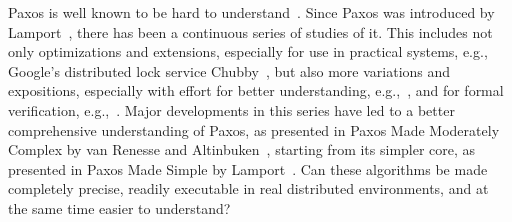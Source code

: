 \documentclass[11pt]{article}
\begin{document}
Paxos is well known to be hard to
understand~\cite{lam01paxos}. %
Since Paxos was introduced by Lamport~\cite{Lam98paxos,lam-paxos-history},
there has been a continuous series of studies of it.
This includes not only optimizations and extensions, especially for use in
practical systems, e.g., Google's distributed lock service
Chubby~\cite{burrows06chubby,chandra07paxos},
but also more variations and expositions, especially with effort for better
understanding,
e.g.,~\cite{lampson1996build,prisco00revisit,lam01paxos,ongaro14raft,vra15paxos,van15vive,garcia18paxos},
and for formal verification,
e.g.,~\cite{hawblitzel2015ironfleet,wilcox2015verdi,woos2016planning,Cha+16PaxosTLAPS-FM,padon2017paxos,ChaLiu18PaxosHistVarTLAPS-NFM,taube2018modular}.
Major developments in this series have led to a better comprehensive
understanding of Paxos, as presented in Paxos Made Moderately Complex by
van Renesse and Altinbuken~\cite{vra15paxos}, starting from its simpler
core, as presented in Paxos Made Simple by Lamport~\cite{lam01paxos}.
Can these algorithms be made completely precise, readily executable in real
distributed environments, and at the same time easier to understand?
\end{document}
